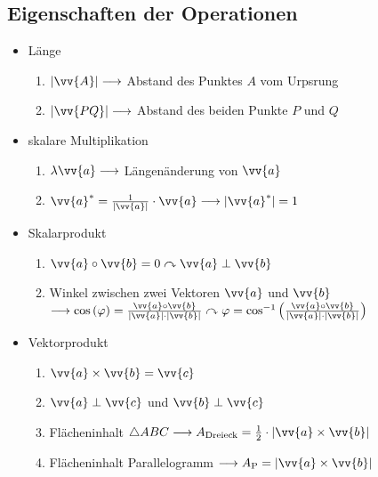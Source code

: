 \documentclass[a4paper,twocolumn,10pt]{onepgnote1}
\begin{document}
\subsection{Eigenschaften der Operationen}
\begin{itemize}
\item Länge\\
\begin{enumerate}
\item $|\vv{A}| \longrightarrow$ Abstand des Punktes $A$ vom Urpsrung\\
\item $|\vv{PQ}| \longrightarrow$ Abstand des beiden Punkte $P$ und $Q$
\end{enumerate}
\item skalare Multiplikation\\
\begin{enumerate}
\item $\lambda \vv{a} \longrightarrow$ Längenänderung von $\vv{a}$\\
\item $\vv{a}^{\ast} = \frac{1}{|\vv{a}|} \cdot \vv{a} \longrightarrow |\vv{a}^{\ast}| = 1$
\end{enumerate}
\item Skalarprodukt\\
\begin{enumerate}
\item $\vv{a}\circ \vv{b} = 0  \curvearrowright \vv{a}\perp \vv{b}$\\
\item Winkel zwischen zwei Vektoren $\vv{a}$ und $\vv{b}$\\ $\longrightarrow \cos{(\varphi)} = \frac{\vv{a} \circ \vv{b}}{|\vv{a}| \cdot |\vv{b}|} \curvearrowright \varphi = \cos^{-1}{\left(\frac{\vv{a} \circ \vv{b}}{|\vv{a}| \cdot |\vv{b}|}\right)} $
\end{enumerate}
\item Vektorprodukt\\
\begin{enumerate}
\item $\vv{a} \times \vv{b} = \vv{c}$\\
\item $\vv{a} \perp \vv{c}$ und $\vv{b} \perp \vv{c}$ \\
\item Flächeninhalt $\triangle ABC \longrightarrow A_{\text{Dreieck}} = \frac{1}{2} \cdot | \vv{a}\times \vv{b}|$\\
\item Flächeninhalt Parallelogramm $\longrightarrow A_{\text{P}} = |\vv{a} \times \vv{b}|$

\end{enumerate}
\end{itemize}
\end{document}
